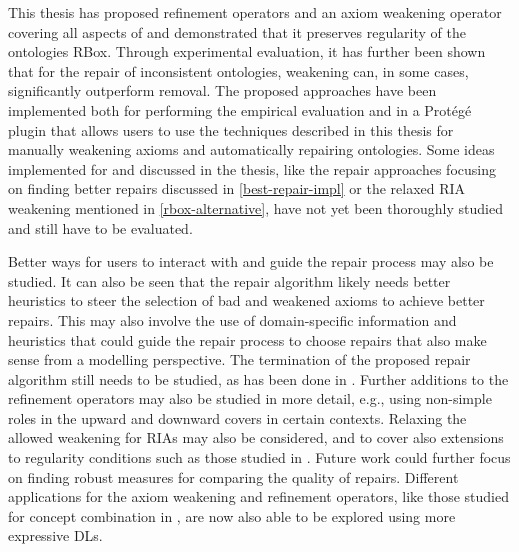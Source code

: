 
This thesis has proposed refinement operators and an axiom weakening operator covering all aspects of \SROIQ and demonstrated that it preserves regularity of the ontologies RBox. Through experimental evaluation, it has further been shown that for the repair of inconsistent ontologies, weakening can, in some cases, significantly outperform removal. The proposed approaches have been implemented both for performing the empirical evaluation and in a Protégé plugin that allows users to use the techniques described in this thesis for manually weakening axioms and automatically repairing ontologies. Some ideas implemented for and discussed in the thesis, like the repair approaches focusing on finding better repairs discussed in \cref{best-repair-impl} or the relaxed RIA weakening mentioned in \cref{rbox-alternative}, have not yet been thoroughly studied and still have to be evaluated.

Better ways for users to interact with and guide the repair process may also be studied. It can also be seen that the repair algorithm likely needs better heuristics to steer the selection of bad and weakened axioms to achieve better repairs. This may also involve the use of domain-specific information and heuristics that could guide the repair process to choose repairs that also make sense from a modelling perspective. The termination of the proposed repair algorithm still needs to be studied, as has been done in \cite{confalonieri2020towards}. Further additions to the refinement operators may also be studied in more detail, e.g., using non-simple roles in the upward and downward covers in certain contexts. Relaxing the allowed weakening for RIAs may also be considered, and to cover also extensions to regularity conditions such as those studied in \cite{DBLP:conf/cade/Kazakov10}. Future work could further focus on finding robust measures for comparing the quality of repairs. Different applications for the axiom weakening and refinement operators, like those studied for concept combination in \cite{righetti2022asymmetric}, are now also able to be explored using more expressive DLs.

